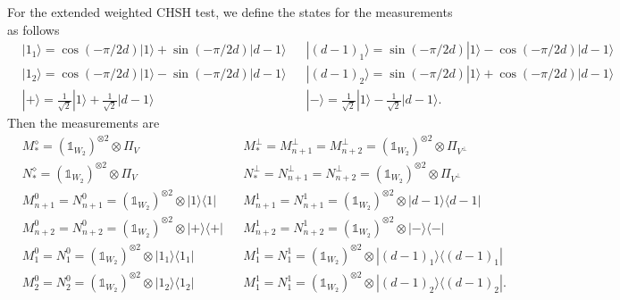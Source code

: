 \documentclass[11pt,letterpaper]{article}
\newcommand{\ket}[1]{|#1\rangle}
\newcommand{\ketbra}[2]{|#1\rangle\langle#2|}
\newcommand{\x}{\otimes}
\newcommand{\1}{\mathbb{1}}
\theoremstyle{definition}
\begin{document}
For the extended weighted CHSH test, we define the states for the measurements as follows
\begin{align*}
	&\ket{1_1} = \cos(-\pi/2d)\ket{1} + \sin(-\pi/2d)\ket{d-1}
	&&\ket{(d-1)_1} = \sin(-\pi/2d)\ket{1} - \cos(-\pi/2d)\ket{d-1}\\
	&\ket{1_2} = \cos(-\pi/2d)\ket{1} - \sin(-\pi/2d)\ket{d-1}
	&&\ket{(d-1)_2} = \sin(-\pi/2d)\ket{1} + \cos(-\pi/2d)\ket{d-1}\\
	&\ket{+} = \frac{1}{\sqrt{2}}\ket{1} + \frac{1}{\sqrt{2}}\ket{d-1}
	&&\ket{-} = \frac{1}{\sqrt{2}}\ket{1} - \frac{1}{\sqrt{2}}\ket{d-1}.
\end{align*}
Then the measurements are
\begin{align}
	&M_\ast^\diamond =(\1_{W_2})^{\x 2} \x \Pi_V && M_\ast^\perp = M_{n+1}^\perp = M_{n+2}^\perp = (\1_{W_2})^{\x 2} \x \Pi_{V^\perp}\\
	&N_\ast^\diamond = (\1_{W_2})^{\x 2} \x \Pi_V && N_\ast^\perp = N_{n+1}^\perp = N_{n+2}^\perp = (\1_{W_2})^{\x 2} \x \Pi_{V^\perp}\\
	&M_{n+1}^0 =N_{n+1}^0=(\1_{W_2})^{\x 2} \x  \ketbra{1}{1} && M_{n+1}^1=N_{n+1}^1 = (\1_{W_2})^{\x 2} \x \ketbra{d-1}{d-1}\\
	&M_{n+2}^0 =N_{n+2}^0=(\1_{W_2})^{\x 2} \x  \ketbra{+}{+} && M_{n+2}^1= N_{n+2}^1 = (\1_{W_2})^{\x 2} \x \ketbra{-}{-}\\
	&M_1^0 = N_1^0 =(\1_{W_2})^{\x 2} \x  \ketbra{1_1}{1_1} && M_1^1 = N_1^1 =(\1_{W_2})^{\x 2} \x  \ketbra{(d-1)_1}{(d-1)_1}\\
	&M_2^0 = N_2^0 = (\1_{W_2})^{\x 2} \x \ketbra{1_2}{1_2} && M_1^1 = N_1^1 = (\1_{W_2})^{\x 2} \x \ketbra{(d-1)_2}{(d-1)_2}.
\end{align}
\end{document}
